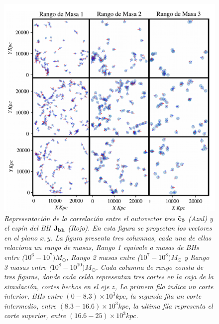 \begin{figure}
    \includegraphics[width=1\textwidth]{./figures/6_Resultados/cosmo01/ll.jpeg}
   \caption[Representación de la correlación entre el autovector tres ${\bf{\vec{e}}_{3}}$ y el espín del BH  ${\bf{J_{bh}}}$]{\emph{Representación de la correlación entre el autovector tres ${\bf{\vec{e}}_{3}}$ (Azul) y el espín del BH ${\bf{J_{bh}}}$ (Rojo). En esta figura se proyectan los vectores en el plano $x,y$. La figura presenta tres columnas, cada una de ellas relaciona un rango de masas, Rango 1 equivale a masas de BHs entre ($10^6-10^7)M_{\odot}$, Rango 2 masas entre ($10^7-10^8)M_{\odot}$ y Rango 3 masas entre ($10^8-10^10)M_{\odot}$. Cada columna de rango consta de tres figuras, donde cada celda  representan tres cortes en la caja de la simulación, cortes hechos en el eje $z$, La primera fila indica un corte interior, BHs entre $(0-8.3)\times10^{3} kpc$,  la segunda fila un corte intermedio, entre $(8.3-16.6)\times10^{3} kpc$, la ultima fila representa el corte superior, entre  $ (16.6-25)\times10^{3} kpc$. }}
    \label{fig: proyeccion espines}
\end{figure}



